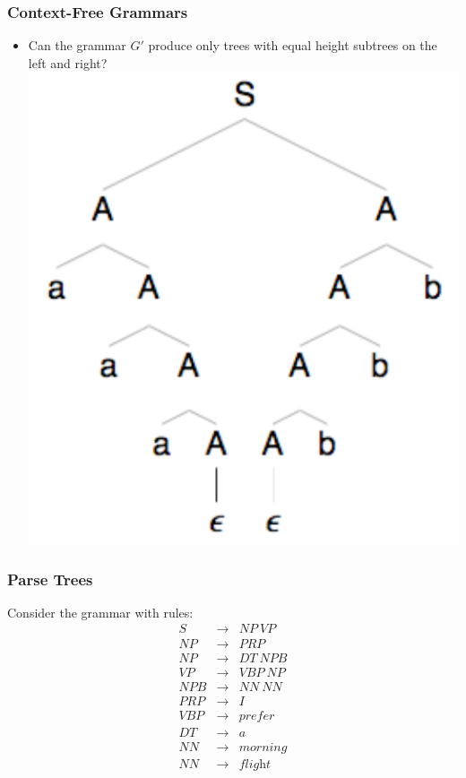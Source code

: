 \begin{frame}
\frametitle{Context-Free Grammars}
\begin{itemize}
\item Can the grammar $G'$ produce only trees with equal height subtrees on the left and right? \\
\includegraphics[scale=0.5]{figures/cfg1}
\end{itemize}

\end{frame}

\begin{frame}
\frametitle{Parse Trees}
\par\noindent
Consider the grammar with rules: 
\begin{eqnarray}
S &\rightarrow& \textit{NP}\ \textit{VP} \nonumber \\
\textit{NP} &\rightarrow& \textit{PRP} \nonumber \\
\textit{NP} &\rightarrow& \textit{DT}\ \textit{NPB} \nonumber \\
\textit{VP} &\rightarrow& \textit{VBP}\ \textit{NP} \nonumber \\
\textit{NPB} &\rightarrow& \textit{NN}\ \textit{NN} \nonumber \\
\textit{PRP} &\rightarrow& \textit{I} \nonumber \\
\textit{VBP} &\rightarrow& \textit{prefer} \nonumber \\
\textit{DT} &\rightarrow& \textit{a} \nonumber \\
\textit{NN} &\rightarrow& \textit{morning} \nonumber \\
\textit{NN} &\rightarrow& \textit{flight} \nonumber
\end{eqnarray}

\end{frame}

